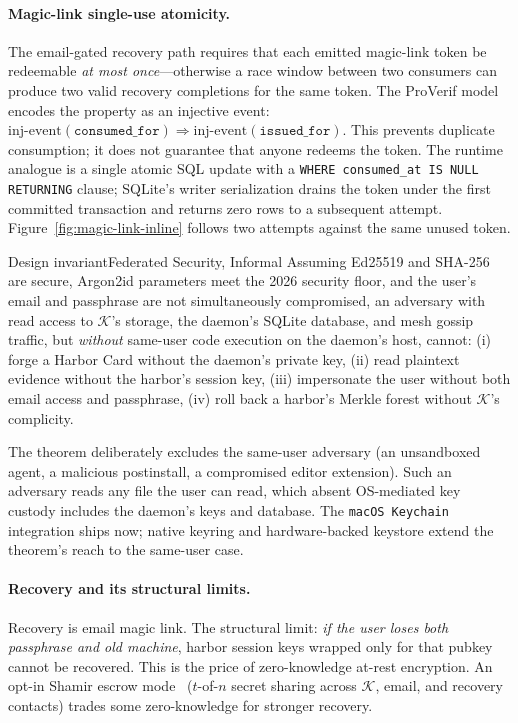 \documentclass[11pt,a4paper]{article}
\theoremstyle{definition}
\theoremstyle{remark}
\begin{document}


\paragraph{Magic-link single-use atomicity.} The email-gated recovery path requires that each emitted magic-link token be redeemable \emph{at most once}---otherwise a race window between two consumers can produce two valid recovery completions for the same token. The ProVerif model encodes the property as an injective event: $\mathrm{inj\text{-}event}(\texttt{consumed\_for}) \Rightarrow \mathrm{inj\text{-}event}(\texttt{issued\_for})$. This prevents duplicate consumption; it does not guarantee that anyone redeems the token. The runtime analogue is a single atomic SQL update with a \texttt{WHERE consumed\_at IS NULL RETURNING} clause; SQLite's writer serialization drains the token under the first committed transaction and returns zero rows to a subsequent attempt. Figure~\ref{fig:magic-link-inline} follows two attempts against the same unused token.



\begin{pdclaim}{Design invariant}{Federated Security, Informal}
\setlength{\parskip}{4pt plus 1pt}
\label{thm:federated-security}
Assuming Ed25519 and SHA-256 are secure, Argon2id parameters meet the 2026 security floor, and the user's email and passphrase are not simultaneously compromised, an adversary with read access to $\mathcal{K}$'s storage, the daemon's SQLite database, and mesh gossip traffic, but \emph{without} same-user code execution on the daemon's host, cannot:
(i) forge a Harbor Card without the daemon's private key,
(ii) read plaintext evidence without the harbor's session key,
(iii) impersonate the user without both email access and passphrase,
(iv) roll back a harbor's Merkle forest without $\mathcal{K}$'s complicity.
\end{pdclaim}

The theorem deliberately excludes the same-user adversary (an unsandboxed agent, a malicious postinstall, a compromised editor extension). Such an adversary reads any file the user can read, which absent OS-mediated key custody includes the daemon's keys and database. The \texttt{macOS Keychain} integration ships now; native keyring and hardware-backed keystore extend the theorem's reach to the same-user case.

\paragraph{Recovery and its structural limits.} Recovery is email magic link. The structural limit: \emph{if the user loses both passphrase and old machine}, harbor session keys wrapped only for that pubkey cannot be recovered. This is the price of zero-knowledge at-rest encryption. An opt-in Shamir escrow mode~ ($t$-of-$n$ secret sharing across $\mathcal{K}$, email, and recovery contacts) trades some zero-knowledge for stronger recovery.
\end{document}

